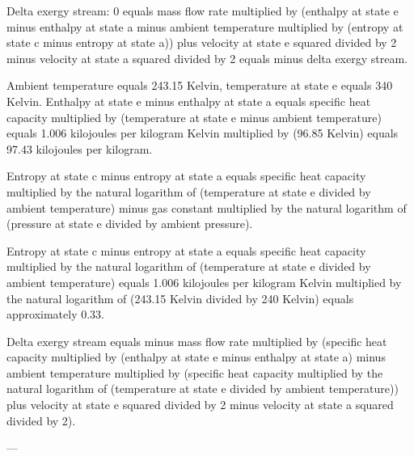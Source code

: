 Delta exergy stream:  
0 equals mass flow rate multiplied by (enthalpy at state e minus enthalpy at state a minus ambient temperature multiplied by (entropy at state c minus entropy at state a)) plus velocity at state e squared divided by 2 minus velocity at state a squared divided by 2 equals minus delta exergy stream.  

Ambient temperature equals 243.15 Kelvin, temperature at state e equals 340 Kelvin.  
Enthalpy at state e minus enthalpy at state a equals specific heat capacity multiplied by (temperature at state e minus ambient temperature) equals 1.006 kilojoules per kilogram Kelvin multiplied by (96.85 Kelvin) equals 97.43 kilojoules per kilogram.  

Entropy at state c minus entropy at state a equals specific heat capacity multiplied by the natural logarithm of (temperature at state e divided by ambient temperature) minus gas constant multiplied by the natural logarithm of (pressure at state e divided by ambient pressure).  

Entropy at state c minus entropy at state a equals specific heat capacity multiplied by the natural logarithm of (temperature at state e divided by ambient temperature) equals 1.006 kilojoules per kilogram Kelvin multiplied by the natural logarithm of (243.15 Kelvin divided by 240 Kelvin) equals approximately 0.33.  

Delta exergy stream equals minus mass flow rate multiplied by (specific heat capacity multiplied by (enthalpy at state e minus enthalpy at state a) minus ambient temperature multiplied by (specific heat capacity multiplied by the natural logarithm of (temperature at state e divided by ambient temperature)) plus velocity at state e squared divided by 2 minus velocity at state a squared divided by 2).  

---